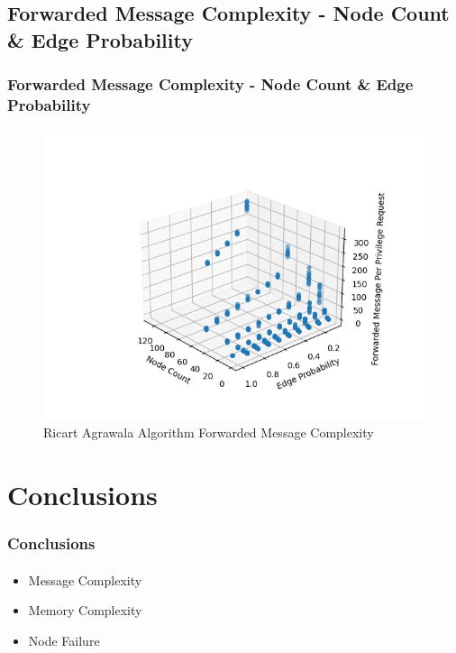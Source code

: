 \documentclass[11pt]{beamer}              %
\begin{document}
\subsection{Forwarded Message Complexity - Node Count \& Edge Probability}
\begin{frame}
\frametitle{Forwarded Message Complexity - Node Count \& Edge Probability}
\framesubtitle{}
\begin{figure}
    \centering
    \includegraphics[scale=0.5]{figures/RicartAgrawalaAlgorithmForwardedMessageComplexity.png}
    \caption{Ricart Agrawala Algorithm Forwarded Message Complexity}
    \label{fig:ricart_agrawala_algoritm_forwarded_message_complexity}
\end{figure}
\end{frame}

\section{Conclusions}
\begin{frame}
\frametitle{Conclusions}
\framesubtitle{}
\begin{itemize}
    \item Message Complexity
    \item Memory Complexity
    \item Node Failure
\end{itemize}

\end{frame}

\thankslide
\end{document}
